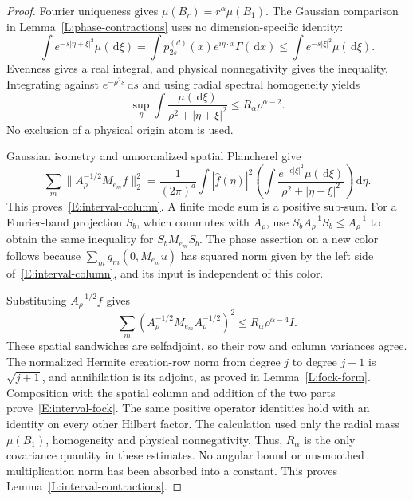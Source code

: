 \documentclass[12pt]{article}
\numberwithin{equation}{section}
\theoremstyle{definition}
\newcommand{\ud}{\,\mathrm{d}}
\begin{document}
\begin{proof}
  Fourier uniqueness gives $\mu(B_r)=r^\alpha\mu(B_1)$.
  The Gaussian comparison in Lemma~\ref{L:phase-contractions} uses no
  dimension-specific identity:
  \[
    \int e^{-s|\eta+\xi|^2}\mu(\ud\xi)
    =\int p_{2s}^{(d)}(x)e^{i\eta\cdot x}\Gamma(\ud x)
    \le\int e^{-s|\xi|^2}\mu(\ud\xi).
  \]
  Evenness gives a real integral, and physical nonnegativity gives
  the inequality. Integrating against $e^{-\rho^2s}\ud s$ and using
  radial spectral homogeneity yields
  \[
    \sup_\eta\int\frac{\mu(\ud\xi)}{\rho^2+|\eta+\xi|^2}
    \le R_\alpha\rho^{\alpha-2}.
  \]
  No exclusion of a physical origin atom is used.

  Gaussian isometry and unnormalized spatial Plancherel give
  \[
    \sum_m\|A_\rho^{-1/2}M_{e_m}f\|_2^2
    =\frac1{(2\pi)^d}\int|\widehat f(\eta)|^2
    \left(\int\frac{e^{-\epsilon|\xi|^2}\mu(\ud\xi)}
    {\rho^2+|\eta+\xi|^2}\right)\ud\eta .
  \]
  This proves~\eqref{E:interval-column}. A finite mode sum is a
  positive sub-sum. For a Fourier-band projection $S_b$, which commutes
  with $A_\rho$, use $S_bA_\rho^{-1}S_b\le A_\rho^{-1}$ to obtain
  the same inequality for $S_bM_{e_m}S_b$.
  The phase assertion on a new color follows because
  $\sum_mg_m(0,M_{e_m}u)$ has squared norm given by the left side
  of~\eqref{E:interval-column}, and its input is independent of this color.

  Substituting $A_\rho^{-1/2}f$ gives
  \[
    \sum_m(A_\rho^{-1/2}M_{e_m}A_\rho^{-1/2})^2
    \le R_\alpha\rho^{\alpha-4}I.
  \]
  These spatial sandwiches are selfadjoint, so their row and column
  variances agree. The normalized Hermite creation-row norm from
  degree $j$ to degree $j+1$ is $\sqrt{j+1}$, and annihilation is
  its adjoint, as proved in Lemma~\ref{L:fock-form}.
  Composition with the spatial column and addition of the two
  parts prove~\eqref{E:interval-fock}. The same positive operator
  identities hold with an identity on every other Hilbert factor.
  The calculation used only the radial mass $\mu(B_1)$, homogeneity
  and physical nonnegativity. Thus, $R_\alpha$ is the only covariance
  quantity in these estimates. No angular bound or unsmoothed
  multiplication norm has been absorbed into a constant.
  This proves Lemma~\ref{L:interval-contractions}.
\end{proof}
\end{document}

